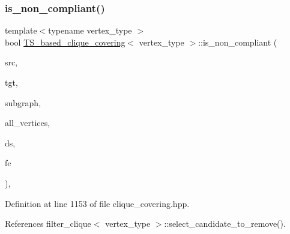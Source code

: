 \subsubsection{\texorpdfstring{is\+\_\+non\+\_\+compliant()}{is\_non\_compliant()}}
{\footnotesize\ttfamily template$<$typename vertex\+\_\+type $>$ \\
bool \hyperlink{classTS__based__clique__covering}{T\+S\+\_\+based\+\_\+clique\+\_\+covering}$<$ vertex\+\_\+type $>$\+::is\+\_\+non\+\_\+compliant (\begin{DoxyParamCaption}\item[{\hyperlink{clique__covering__graph_8hpp_a9cb45047ea8c5ed95a8cfa90494345aa}{C\+\_\+vertex}}]{src,  }\item[{\hyperlink{clique__covering__graph_8hpp_a9cb45047ea8c5ed95a8cfa90494345aa}{C\+\_\+vertex}}]{tgt,  }\item[{const \hyperlink{clique__covering__graph_8hpp_aa88e9419fe776ef37020cacd507cc4ad}{cc\+\_\+compatibility\+\_\+graph} \&}]{subgraph,  }\item[{const \hyperlink{classCustomUnorderedSet}{Custom\+Unordered\+Set}$<$ \hyperlink{clique__covering__graph_8hpp_a9cb45047ea8c5ed95a8cfa90494345aa}{C\+\_\+vertex} $>$ \&}]{all\+\_\+vertices,  }\item[{typename boost\+::disjoint\+\_\+sets$<$ \hyperlink{clique__covering__graph_8hpp_af170aff46b9e4328f1ad9b119cf78b4a}{rank\+\_\+pmap\+\_\+type}, \hyperlink{clique__covering__graph_8hpp_af4c454ac367cfb12e29c98e6bc942a06}{pred\+\_\+pmap\+\_\+type} $>$ \&}]{ds,  }\item[{const \hyperlink{structfilter__clique}{filter\+\_\+clique}$<$ vertex\+\_\+type $>$ \&}]{fc }\end{DoxyParamCaption})\hspace{0.3cm}{\ttfamily [inline]}, {\ttfamily [private]}}



Definition at line 1153 of file clique\+\_\+covering.\+hpp.



References filter\+\_\+clique$<$ vertex\+\_\+type $>$\+::select\+\_\+candidate\+\_\+to\+\_\+remove().

